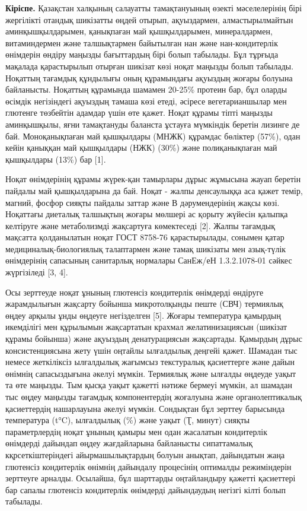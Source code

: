 \begin{multicols}{2}

{\bfseries Кіріспе.} Қазақстан халқының салауатты тамақтануының өзекті
мәселелерінің бірі жергілікті отандық шикізатты өңдей отырып,
ақуыздармен, алмастырылмайтын аминқышқылдарымен, қанықпаған май
қышқылдарымен, минералдармен, витаминдермен және талшықтармен байытылған
нан және нан-кондитерлік өнімдерін өндіру маңызды бағыттардың бірі болып
табылады. Бұл тұрғыда мақалада қарастырылып отырған шикізат көзі ноқат
маңызды болып табылады. Ноқаттың тағамдық құндылығы оның құрамындағы
ақуыздың жоғары болуына байланысты. Ноқаттың құрамында шамамен 20-25\%
протеин бар, бұл оларды өсімдік негізіндегі ақуыздың тамаша көзі етеді,
әсіресе вегетарианшылар мен глютенге төзбейтін адамдар үшін өте қажет.
Ноқат құрамы тіпті маңызды аминқышқылы, яғни тамақтануды баланста
ұстауға мүмкіндік беретін лизинге де бай. Моноқанықпаған май қышқылдары
(МНЖК) құрамдас бөліктер (57\%), одан кейін қаныққан май қышқылдары
(НЖК) (30\%) және полиқанықпаған май қышқылдары (13\%) бар {[}1{]}.

Ноқат өнімдерінің құрамы жүрек-қан тамырлары дұрыс жұмысына жауап
беретін пайдалы май қышқылдарына да бай. Ноқат - жалпы денсаулыққа аса
қажет темір, магний, фосфор сияқты пайдалы заттар және В дәрумендерінің
жақсы көзі. Ноқаттағы диеталық талшықтың жоғары мөлшері ас қорыту
жүйесін қалыпқа келтіруге және метаболизмді жақсартуға көмектеседі
{[}2{]}. Жалпы тағамдық мақсатта қолданылатын ноқат ГОСТ 8758-76
қарастырылады, сонымен қатар медициналық-биологиялық талаптармен және
тамақ шикізаты мен азық-түлік өнімдерінің сапасының санитарлық нормалары
СанЕж/еН 1.3.2.1078-01 сәйкес жүргізіледі {[}3, 4{]}.

Осы зерттеуде ноқат ұнының глютенсіз кондитерлік өнімдерді өндіруге
жарамдылығын жақсарту бойынша микротолқынды пеште (СВЧ) термиялық өңдеу
арқылы ұнды өңдеуге негізделген {[}5{]}. Жоғары температура қамырдың
икемділігі мен құрылымын жақсартатын крахмал желатинизациясын (шикізат
құрамы бойынша) және ақуыздың денатурациясын жақсартады. Қамырдың дұрыс
консистенциясына жету үшін оңтайлы ылғалдылық деңгейі қажет. Шамадан тыс
немесе жеткіліксіз ылғалдылық жағымсыз текстуралық қасиеттерге және
дайын өнімнің сапасыздығына әкелуі мүмкін. Термиялық және ылғалды
өңдеуде уақыт та өте маңызды. Тым қысқа уақыт қажетті нәтиже бермеуі
мүмкін, ал шамадан тыс өңдеу маңызды тағамдық компонентердің жоғалуына
және органолептикалық қасиеттердің нашарлауына әкелуі мүмкін. Сондықтан
бұл зерттеу барысында температура (t°C), ылғалдылық (\%) және уақыт (Ʈ,
минут) сияқты параметрлердің ноқат ұнының қамыры мен одан жасалатын
кондитерлік өнімдерді дайындап өңдеу жағдайларына байланысты
сипаттамалық кқрсеткіштеріндегі айырмашылықтардың болуын анықтап,
дайындатын жаңа глютенсіз кондитерлік өнімнің дайындалу процесінің
оптималды режиміндерін зерттеуге арналды. Осылайша, бұл шарттарды
оңтайландыру қажетті қасиеттері бар сапалы глютенсіз кондитерлік
өнімдерді дайындаудың негізгі кілті болып табылады.


\end{multicols}
